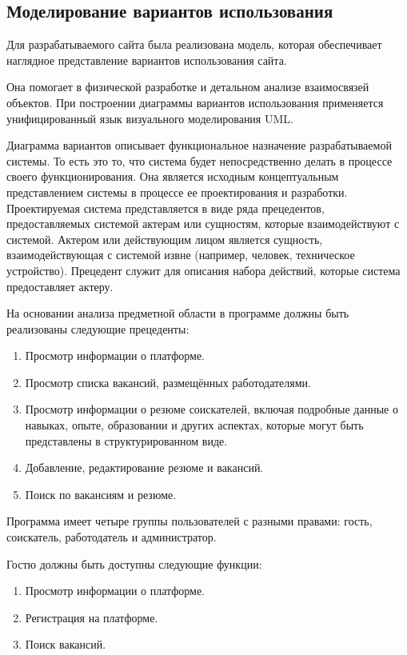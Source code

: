 \subsection{Моделирование вариантов использования}

Для разрабатываемого сайта была реализована модель, которая обеспечивает наглядное представление вариантов использования сайта.

Она помогает в физической разработке и детальном анализе взаимосвязей объектов. При построении диаграммы вариантов использования применяется унифицированный язык визуального моделирования UML.

Диаграмма вариантов описывает функциональное назначение разрабатываемой системы. То есть это то, что система будет непосредственно делать в процессе своего функционирования. Она является исходным концептуальным представлением системы в процессе ее проектирования и разработки. Проектируемая система представляется в виде ряда прецедентов, предоставляемых системой актерам или сущностям, которые взаимодействуют с системой. Актером или действующим лицом является сущность, взаимодействующая с системой извне (например, человек, техническое устройство). Прецедент служит для описания набора действий, которые система предоставляет актеру.

На основании анализа предметной области в программе должны быть реализованы следующие прецеденты:
\begin{enumerate}
\item Просмотр информации о платформе.
\item Просмотр списка вакансий, размещённых работодателями.
\item Просмотр информации о резюме соискателей, включая подробные данные о навыках, опыте, образовании и других аспектах, которые могут быть представлены в структурированном виде.
\item Добавление, редактирование резюме и вакансий.
\item Поиск по вакансиям и резюме.
\end{enumerate}

Программа имеет четыре группы пользователей с разными правами:
гость, соискатель, работодатель и администратор.

Гостю должны быть доступны следующие функции:

\begin{enumerate}
	\item Просмотр информации о платформе.
	\item Регистрация на платформе.
	\item Поиск вакансий.
\end{enumerate}

